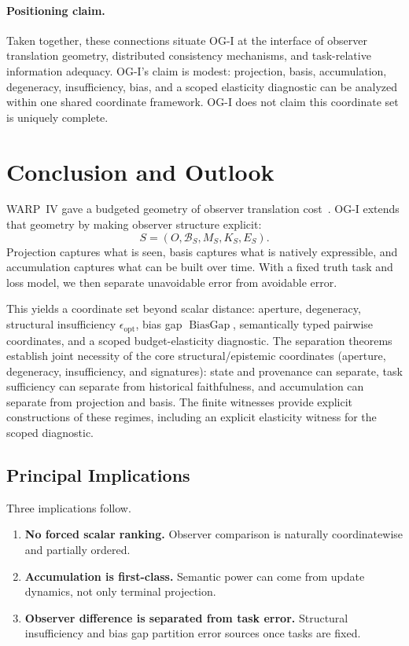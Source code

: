 \documentclass[11pt,twoside]{article}
\theoremstyle{definition}
\DeclareMathOperator{\BiasGap}{BiasGap}
\begin{document}
\paragraph{Positioning claim.}
Taken together, these connections situate OG-I at the interface of observer translation geometry, distributed consistency mechanisms, and task-relative information adequacy. OG-I's claim is modest: projection, basis, accumulation, degeneracy, insufficiency, bias, and a scoped elasticity diagnostic can be analyzed within one shared coordinate framework. OG-I does not claim this coordinate set is uniquely complete.

\section{Conclusion and Outlook}
\label{sec:conclusion}

WARP~IV gave a budgeted geometry of observer translation cost~\cite{ross_paper_iv}. OG-I extends that geometry by making observer structure explicit:
\[
  S=(O,\mathcal{B}_S,M_S,K_S,E_S).
\]
Projection captures what is seen, basis captures what is natively expressible, and accumulation captures what can be built over time. With a fixed truth task and loss model, we then separate unavoidable error from avoidable error.

This yields a coordinate set beyond scalar distance: aperture, degeneracy, structural insufficiency \(\epsilon_{\mathrm{opt}}\), bias gap \(\BiasGap\), semantically typed pairwise coordinates, and a scoped budget-elasticity diagnostic. The separation theorems establish joint necessity of the core structural/epistemic coordinates (aperture, degeneracy, insufficiency, and signatures): state and provenance can separate, task sufficiency can separate from historical faithfulness, and accumulation can separate from projection and basis. The finite witnesses provide explicit constructions of these regimes, including an explicit elasticity witness for the scoped diagnostic.

\subsection{Principal Implications}
\label{subsec:what-has-been-gained}

Three implications follow.
\begin{enumerate}[leftmargin=*]
  \item \textbf{No forced scalar ranking.} Observer comparison is naturally coordinatewise and partially ordered.
  \item \textbf{Accumulation is first-class.} Semantic power can come from update dynamics, not only terminal projection.
  \item \textbf{Observer difference is separated from task error.} Structural insufficiency and bias gap partition error sources once tasks are fixed.
\end{enumerate}
\end{document}
